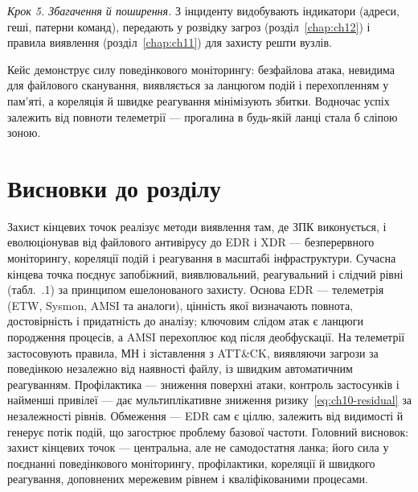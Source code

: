 \emph{Крок 5. Збагачення й поширення.} З інциденту видобувають індикатори (адреси, геші, патерни команд), передають у розвідку загроз (розділ~\ref{chap:ch12}) і правила виявлення (розділ~\ref{chap:ch11}) для захисту решти вузлів.

Кейс демонструє силу поведінкового моніторингу: безфайлова атака, невидима для файлового сканування, виявляється за ланцюгом подій і перехопленням у пам'яті, а кореляція й швидке реагування мінімізують збитки. Водночас успіх залежить від повноти телеметрії --- прогалина в будь-якій ланці стала б сліпою зоною.

\section*{Висновки до розділу}

Захист кінцевих точок реалізує методи виявлення там, де ЗПК виконується, і еволюціонував від файлового антивірусу до EDR і XDR --- безперервного моніторингу, кореляції подій і реагування в масштабі інфраструктури. Сучасна кінцева точка поєднує запобіжний, виявлювальний, реагувальний і слідчий рівні (табл.~\thechapter.1) за принципом ешелонованого захисту. Основа EDR --- телеметрія (ETW, Sysmon, AMSI та аналоги), цінність якої визначають повнота, достовірність і придатність до аналізу; ключовим слідом атак є ланцюги породження процесів, а AMSI перехоплює код після деобфускації. На телеметрії застосовують правила, МН і зіставлення з ATT\&CK, виявляючи загрози за поведінкою незалежно від наявності файлу, із швидким автоматичним реагуванням. Профілактика --- зниження поверхні атаки, контроль застосунків і найменші привілеї --- дає мультиплікативне зниження ризику~\eqref{eq:ch10-residual} за незалежності рівнів. Обмеження --- EDR сам є ціллю, залежить від видимості й генерує потік подій, що загострює проблему базової частоти. Головний висновок: захист кінцевих точок --- центральна, але не самодостатня ланка; його сила у поєднанні поведінкового моніторингу, профілактики, кореляції й швидкого реагування, доповнених мережевим рівнем і кваліфікованими процесами.

